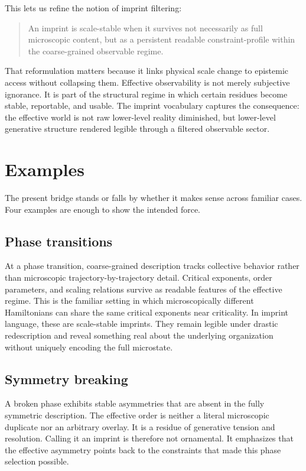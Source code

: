 \documentclass[12pt]{article}
\begin{document}
This lets us refine the notion of imprint filtering:

\begin{quote}
An imprint is scale-stable when it survives not necessarily as full microscopic content, but as a persistent readable constraint-profile within the coarse-grained observable regime.
\end{quote}

That reformulation matters because it links physical scale change to epistemic access without collapsing them. Effective observability is not merely subjective ignorance. It is part of the structural regime in which certain residues become stable, reportable, and usable. The imprint vocabulary captures the consequence: the effective world is not raw lower-level reality diminished, but lower-level generative structure rendered legible through a filtered observable sector.

\section{Examples}

The present bridge stands or falls by whether it makes sense across familiar cases. Four examples are enough to show the intended force.

\subsection{Phase transitions}

At a phase transition, coarse-grained description tracks collective behavior rather than microscopic trajectory-by-trajectory detail. Critical exponents, order parameters, and scaling relations survive as readable features of the effective regime. This is the familiar setting in which microscopically different Hamiltonians can share the same critical exponents near criticality. In imprint language, these are scale-stable imprints. They remain legible under drastic redescription and reveal something real about the underlying organization without uniquely encoding the full microstate.

\subsection{Symmetry breaking}

A broken phase exhibits stable asymmetries that are absent in the fully symmetric description. The effective order is neither a literal microscopic duplicate nor an arbitrary overlay. It is a residue of generative tension and resolution. Calling it an imprint is therefore not ornamental. It emphasizes that the effective asymmetry points back to the constraints that made this phase selection possible.
\end{document}
